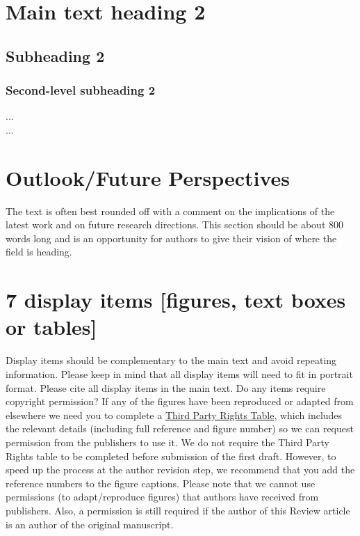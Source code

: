 \documentclass[fleqn,10pt]{wlscirep}
\begin{document}
\section*{Main text heading 2}

\subsection*{Subheading 2}
\subsubsection*{Second-level subheading 2}
...\\
...

\section*{Outlook/Future Perspectives}
The text is often best rounded off with a comment on the implications of the latest work and on future research directions.  This section should be about 800 words long and is an opportunity for authors to give their vision of where the field is heading.

\section*{7 display items [figures, text boxes or tables]}

Display items should be complementary to the main text and avoid repeating information. Please keep in mind that all display items will need to fit in portrait format. Please cite all display items in the main text. Do any items require copyright permission? If any of the figures have been reproduced or adapted from elsewhere we need you to complete a \href{http://www.nature.com/licenceforms/npg/thirdpartyrights-table.doc}{Third Party Rights Table}, which includes the relevant details (including full reference and figure number) so we can request permission from the publishers to use it.  We do not require the Third Party Rights table to be completed before submission of the first draft.  However, to speed up the process at the author revision step, we recommend that you add the reference numbers to the figure captions.  Please note that we cannot use permissions (to adapt/reproduce figures) that authors have received from publishers. Also, a permission is still required if the author of this Review article is an author of the original manuscript.\\
\end{document}
